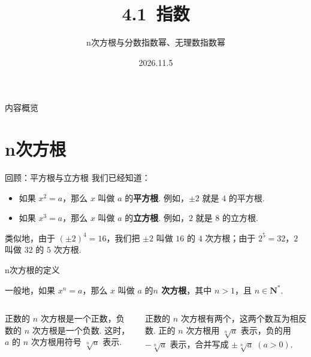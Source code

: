 \documentclass[aspectratio=169,13pt,t,fleqn] {beamer}
\title[4.1指数]{4.1\ 指数}
\subtitle{n次方根与分数指数幂、无理数指数幂}
\author[好好学习，努力向上]{}
\institute{}
\date{2026.11.5}
\theoremstyle{definition}
\begin{document}
\begin{frame}{}
	\titlepage
\end{frame}

\begin{frame}{内容概览}
	\tableofcontents
\end{frame}

\section{n次方根}

\begin{frame}{回顾：平方根与立方根}
	我们已经知道：
	\begin{itemize}
		\item 如果 \(x^2=a\)，那么 \(x\) 叫做 \(a\) 的\textbf{平方根}. 例如，\(\pm 2\) 就是 \(4\) 的平方根.
		\item 如果 \(x^3=a\)，那么 \(x\) 叫做 \(a\) 的\textbf{立方根}. 例如，\(2\) 就是 \(8\) 的立方根.
	\end{itemize}
	\vspace{1em}
	\pause
	类似地，由于 \((\pm 2)^4=16\)，我们把 \(\pm 2\) 叫做 \(16\) 的 \(4\) 次方根；由于 \(2^5=32\)，\(2\) 叫做 \(32\) 的 \(5\) 次方根.
\end{frame}

\begin{frame}{n次方根的定义}
	\begin{summarybox}[n次方根]
		一般地，如果 \(x^n=a\)，那么 \(x\) 叫做 \(a\) 的\textbf{\(n\) 次方根}，其中 \(n>1\)，且 \(n\in \mathbf{N}^{*}\).
	\end{summarybox}
	\vspace{1em}
	\begin{columns}
		\begin{summarybox}
			正数的 \(n\) 次方根是一个正数，负数的 \(n\) 次方根是一个负数. 这时，\(a\) 的 \(n\) 次方根用符号 \(\sqrt[n]{a}\) 表示.
		\end{summarybox}
		\begin{summarybox}
			正数的 \(n\) 次方根有两个，这两个数互为相反数. 正的 \(n\) 次方根用 \(\sqrt[n]{a}\) 表示，负的用 \(-\sqrt[n]{a}\) 表示，合并写成 \(\pm\sqrt[n]{a}\;(a>0)\).
		\end{summarybox}
	\end{columns}
\end{frame}
\end{document}
